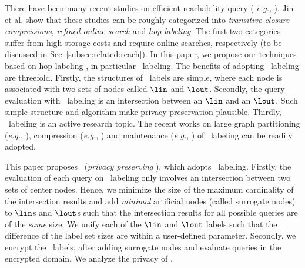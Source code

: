 There have been many recent studies  on efficient reachability query ({\it
e.g.}, \cite{pathtree, bitcompression,grail, gripp, ferrari,3hop, pathhop,
sigmod2013, hopi, chengjf1 ,chengjf2, byron}). Jin et al. \cite{sigmod2012}
show that these studies can be roughly categorized into {\em transitive closure
compressions}, {\em refined online search} and {\em hop labeling}. The first
two categories suffer from high storage costs and require
online searches, respectively (to be discussed in
Sec~\ref{subsec:related:reach}).
In this paper, we propose our techniques based on hop  labeling
\cite{cohen}, in particular \hop\ labeling. The benefits of adopting \hop\ labeling are
threefold. Firstly, the structures of \hop\ labels are simple, where
each node is associated with two sets of nodes called $\lin$ and
$\lout$. Secondly, the query evaluation with \hop\ labeling is
an intersection between an $\lin$ and an $\lout$. Such simple
structure and algorithm make privacy
preservation plausible. Thirdly, \hop\ labeling is an active research
topic. The recent works on large graph  partitioning ({\it e.g.}, \cite{chengjf2}),
compression ({\it e.g.}, \cite{chengjf1}) and maintenance ({\it e.g.},
\cite{hopi,byron}) of \hop\ labeling can be readily adopted.




This paper proposes \pphop\ ({\em privacy preserving \hop}), which adopts
\hop\ labeling. 
Firstly, 
the evaluation of each query on \hop\ labeling only involves an intersection between
two sets of center nodes.  Hence, we minimize the size of the
maximum cardinality of the intersection results and add {\em minimal}
artificial nodes (called surrogate nodes) to $\lin$s and $\lout$s such
that the intersection results for all possible queries are of the {\em
  same} size. We  unify each of the $\lin$ and $\lout$
labels such that the difference of the label set sizes are
within a user-defined parameter.
Secondly, we encrypt the \hop\ labels, after adding surrogate nodes
and evaluate queries in the encrypted domain. We analyze the privacy
of \pphop.



